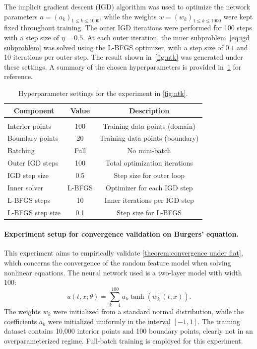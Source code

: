 \documentclass{article}
\begin{document}
The implicit gradient descent (IGD) algorithm was used to optimize the network parameters $a=(a_k)_{1\leq k\leq 1000}$, while the weights $w=(w_k)_{1\leq k\leq 1000}$ were kept fixed throughout training.  
The outer IGD iterations were performed for 100 steps with a step size of $\eta = 0.5$.  
At each outer iteration, the inner subproblem~\cref{eq:igd subproblem} was solved using the L-BFGS optimizer, with a step size of $0.1$ and 10 iterations per outer step.  
The result shown in~\cref{fig:ntk} was generated under these settings.  
A summary of the chosen hyperparameters is provided in~\cref{tab:ntk_hyperparams} for reference.
\begin{table}[h]
\caption{Hyperparameter settings for the experiment in \cref{fig:ntk}.}
\label{tab:ntk_hyperparams}
\begin{center}
\begin{tabular}{lcc}
\multicolumn{1}{c}{\bf Component} & \multicolumn{1}{c}{\bf Value} & \multicolumn{1}{c}{\bf Description} \\
\hline \\
Interior points      & 100      & Training data points (domain) \\
Boundary points      & 20       & Training data points (boundary) \\
Batching             & Full     & No mini-batch \\
Outer IGD steps      & 100      & Total optimization iterations \\
IGD step size        & 0.5      & Step size for outer loop \\
Inner solver         & L-BFGS   & Optimizer for each IGD step \\
L-BFGS steps         & 10       & Inner iterations per IGD step \\
L-BFGS step size     & 0.1      & Step size for L-BFGS \\
\end{tabular}
\end{center}
\end{table}

\paragraph{Experiment setup for convergence validation on Burgers' equation.}
This experiment aims to empirically validate \cref{theorem:convergence under flat}, which concerns the convergence of the random feature model when solving nonlinear equations. 
The neural network used is a two-layer model with width 100:
\begin{equation*}
    u(t,x; \theta) = \sum_{k=1}^{100} a_k \tanh\left(w_k^\top (t,x)\right).
\end{equation*}
The weights $w_k$ were initialized from a standard normal distribution, while the coefficients $a_k$ were initialized uniformly in the interval $[-1, 1]$. 
The training dataset contains 10,000 interior points and 100 boundary points, clearly not in an overparameterized regime. 
Full-batch training is employed for this experiment.
\end{document}

